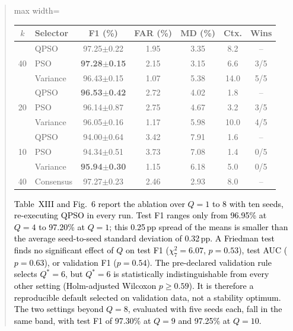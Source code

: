 \documentclass[11pt]{article}
\newenvironment{excerpt}{\begin{quote}\sloppy}{\end{quote}}
\begin{document}
\begin{excerpt}
\begin{table}[H]
\color{black}
\setlength{\tabcolsep}{3pt}
\begin{adjustbox}{max width=\linewidth}
\begin{tabular}{clccccc}
\hline\toprule
$k$ & Selector & F1 (\%) & FAR (\%) & MD (\%) & Ctx. & Wins \\
\hline\toprule
\multirow{3}{*}{40} & QPSO & 97.25$\pm$0.22 & 1.95 & 3.35 & 8.2 & -- \\
 & PSO & \textbf{97.28$\pm$0.15} & 2.15 & 3.15 & 6.6 & 3/5 \\
 & Variance & 96.43$\pm$0.15 & 1.07 & 5.38 & 14.0 & 5/5 \\
\midrule
\multirow{3}{*}{20} & QPSO & \textbf{96.53$\pm$0.42} & 2.72 & 4.02 & 1.8 & -- \\
 & PSO & 96.14$\pm$0.87 & 2.75 & 4.67 & 3.2 & 3/5 \\
 & Variance & 96.05$\pm$0.16 & 1.17 & 5.98 & 10.0 & 4/5 \\
\midrule
\multirow{3}{*}{10} & QPSO & 94.00$\pm$0.64 & 3.42 & 7.91 & 1.6 & -- \\
 & PSO & 94.34$\pm$0.51 & 3.73 & 7.08 & 1.4 & 0/5 \\
 & Variance & \textbf{95.94$\pm$0.30} & 1.15 & 6.18 & 5.0 & 0/5 \\
\midrule
40 & Consensus & 97.27$\pm$0.23 & 2.46 & 2.93 & 8.0 & -- \\
\hline\toprule
\end{tabular}
\end{adjustbox}
\end{table}

\textcolor{black}{Table~XIII
and Fig.~6 report the ablation over $Q=1$ to 8 with
ten seeds, re-executing QPSO in every run. Test F1 ranges only from
96.95\% at $Q=4$ to 97.20\% at $Q=1$; this 0.25\,pp spread of the
means is smaller than the average seed-to-seed standard deviation of
0.32\,pp. A Friedman test finds no significant effect of $Q$ on test
F1 ($\chi^2_7=6.07$, $p=0.53$), test AUC ($p=0.63$), or validation F1
($p=0.54$). The pre-declared validation rule selects $Q^{*}=6$, but
$Q^{*}=6$ is statistically indistinguishable from every other setting
(Holm-adjusted Wilcoxon $p\ge0.59$). It is therefore a reproducible
default selected on validation data, not a stability optimum. The two
settings beyond $Q=8$, evaluated with five seeds each, fall in the same band,
with test F1 of 97.30\% at $Q=9$ and 97.25\% at $Q=10$.}

\setcounter{table}{12}
\begin{table}[H]
\centering
\caption{\textcolor{black}{Detection versus QPSO register size over ten seeds; last column: Holm-adjusted p-value against Q = 6.}}


\end{table}
\end{excerpt}
\end{document}
